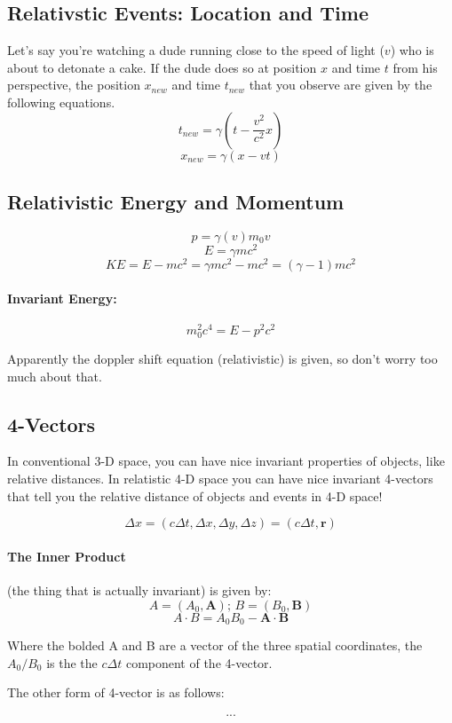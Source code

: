 \documentclass[a4paper,12pt]{report}
\begin{document}
\subsection{Relativstic Events: Location and Time}
Let's say you're watching a dude running close to the speed of light ($v$) who is about to detonate a cake. If the dude does so at 
position $x$ and time $t$ from his perspective, the position $x_{new}$ and time $t_{new}$ that you observe are given by the following 
equations.
$$t_{new}=\gamma(t-\frac{v^2}{c^2}x)$$
$$x_{new}=\gamma(x-vt)$$

\subsection{Relativistic Energy and Momentum}
$$p=\gamma(v)m_0v$$
$$E = \gamma mc^2$$
$$KE=E-mc^2=\gamma mc^2-mc^2=(\gamma-1)mc^2$$

\paragraph{Invariant Energy: }
$$m_0^2c^4=E-p^2c^2$$

Apparently the doppler shift equation (relativistic) is given, so don't worry too much about that.

\subsection{4-Vectors}
In conventional 3-D space, you can have nice invariant properties of objects, like relative distances. In relatistic 4-D space 
you can have nice invariant 4-vectors that tell you the relative distance of objects and events in 4-D space!

$$\Delta x = (c\Delta t,\Delta x, \Delta y, \Delta z) = (c\Delta t, \pmb{r})$$

\paragraph{The Inner Product} (the thing that is actually invariant) is given by: 
$$A = (A_0, \pmb{A}); \, B = (B_0, \pmb{B})$$
$$A\cdot B=A_0B_0 - \pmb{A}\cdot \pmb{B}$$

Where the bolded A and B are a vector of the three spatial coordinates, the $A_0/B_0$ is the the $c\Delta t$ component of the 4-vector.

The other form of 4-vector is as follows: 

$$...$$
\end{document}
